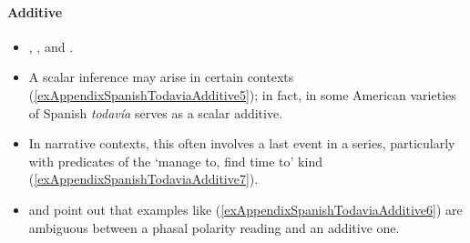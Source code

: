 \paragraph{Additive}
\label{appendixSpanishTodaviaAdditive}
\begin{itemize}
	\item \textcite{Bosque2016}, \textcite{Garrido1993}, \textcite[§§30.8k–p, 40.8l–m]{RAEGramatica} and \textcite{Trujillo1990}.
	\item A scalar inference may arise in certain contexts (\ref{exAppendixSpanishTodaviaAdditive5}); in fact, in some American varieties of Spanish \textit{todavía} serves as a scalar additive.
	\item In narrative contexts, this often involves a last event in a series, particularly with predicates of the \lq manage to, find time to\rq{ }kind (\ref{exAppendixSpanishTodaviaAdditive7}).
	\item \textcite{Bosque2016} and \textcite{RAEGramatica} point out that examples like (\ref{exAppendixSpanishTodaviaAdditive6}) are ambiguous between a phasal polarity reading and an additive one.
\end{itemize}

